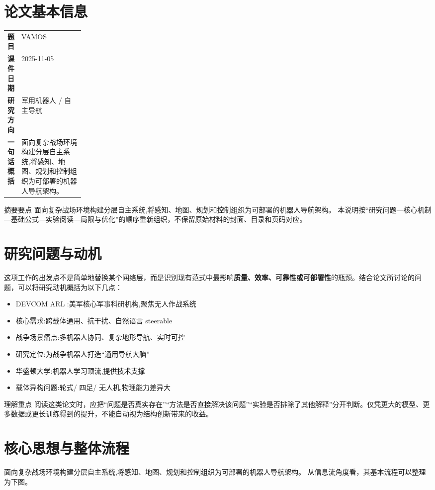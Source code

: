 \documentclass[UTF8,11pt,a4paper]{ctexart}
\newcommand{\term}[1]{\textbf{\textcolor{mainblue}{#1}}}
\begin{document}
\section{论文基本信息}
\begin{center}
\begin{tabularx}{0.94\linewidth}{>{\bfseries}p{0.18\linewidth}X}
\toprule
题目 & VAMOS\\
课件日期 & 2025-11-05\\
研究方向 & 军用机器人 / 自主导航\\
一句话概括 & 面向复杂战场环境构建分层自主系统,将感知、地图、规划和控制组织为可部署的机器人导航架构。\\
\bottomrule
\end{tabularx}
\end{center}

\begin{infobox}{摘要要点}
面向复杂战场环境构建分层自主系统,将感知、地图、规划和控制组织为可部署的机器人导航架构。 本说明按“研究问题—核心机制—基础公式—实验阅读—局限与优化”的顺序重新组织，不保留原始材料的封面、目录和页码对应。
\end{infobox}

\section{研究问题与动机}
这项工作的出发点不是简单地替换某个网络层，而是识别现有范式中最影响\term{质量、效率、可靠性或可部署性}的瓶颈。结合论文所讨论的问题，可以将研究动机概括为以下几点：
\begin{itemize}
\item DEVCOM ARL :美军核心军事科研机构,聚焦无人作战系统
\item 核心需求:跨载体通用、抗干扰、自然语言 steerable
\item 战争场景痛点:多机器人协同、复杂地形导航、实时可控
\item 研究定位:为战争机器人打造“通用导航大脑”
\item 华盛顿大学:机器人学习顶流,提供技术支撑
\item 载体异构问题:轮式/ 四足/ 无人机,物理能力差异大
\end{itemize}

\begin{notebox}{理解重点}
阅读这类论文时，应把“问题是否真实存在”“方法是否直接解决该问题”“实验是否排除了其他解释”分开判断。仅凭更大的模型、更多数据或更长训练得到的提升，不能自动视为结构创新带来的收益。
\end{notebox}

\section{核心思想与整体流程}
面向复杂战场环境构建分层自主系统,将感知、地图、规划和控制组织为可部署的机器人导航架构。 从信息流角度看，其基本流程可以整理为下图。
\end{document}
